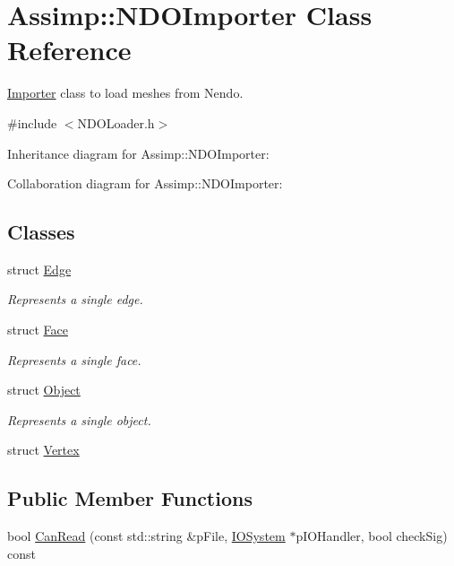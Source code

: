 \hypertarget{class_assimp_1_1_n_d_o_importer}{\section{Assimp\+:\+:N\+D\+O\+Importer Class Reference}
\label{class_assimp_1_1_n_d_o_importer}
}


\hyperlink{class_assimp_1_1_importer}{Importer} class to load meshes from Nendo.  




{\ttfamily \#include $<$N\+D\+O\+Loader.\+h$>$}



Inheritance diagram for Assimp\+:\+:N\+D\+O\+Importer\+:


Collaboration diagram for Assimp\+:\+:N\+D\+O\+Importer\+:
\subsection*{Classes}
\begin{DoxyCompactItemize}
\item 
struct \hyperlink{struct_assimp_1_1_n_d_o_importer_1_1_edge}{Edge}
\begin{DoxyCompactList}\small\item\em Represents a single edge. \end{DoxyCompactList}\item 
struct \hyperlink{struct_assimp_1_1_n_d_o_importer_1_1_face}{Face}
\begin{DoxyCompactList}\small\item\em Represents a single face. \end{DoxyCompactList}\item 
struct \hyperlink{struct_assimp_1_1_n_d_o_importer_1_1_object}{Object}
\begin{DoxyCompactList}\small\item\em Represents a single object. \end{DoxyCompactList}\item 
struct \hyperlink{struct_assimp_1_1_n_d_o_importer_1_1_vertex}{Vertex}
\end{DoxyCompactItemize}
\subsection*{Public Member Functions}
\begin{DoxyCompactItemize}
\item 
bool \hyperlink{class_assimp_1_1_n_d_o_importer_a6506fd5111c641f180217c600467b128}{Can\+Read} (const std\+::string \&p\+File, \hyperlink{class_assimp_1_1_i_o_system}{I\+O\+System} $\ast$p\+I\+O\+Handler, bool check\+Sig) const 
\end{DoxyCompactItemize}

